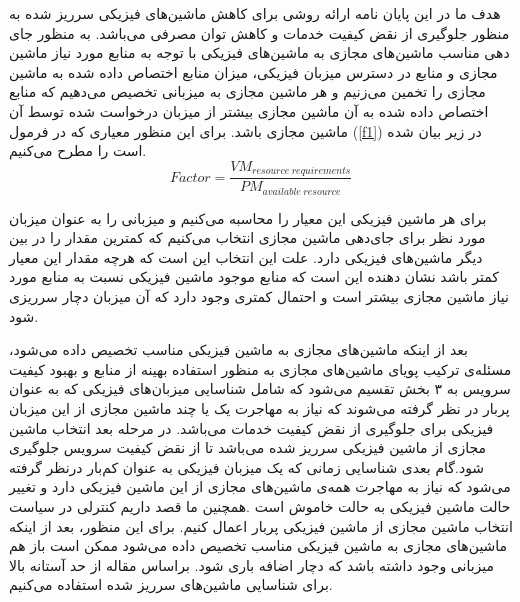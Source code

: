 هدف ما در این پایان نامه ارائه روشی برای کاهش ماشین‌های فیزیکی سرریز شده به منظور جلوگیری از نقض کیفیت خدمات و کاهش توان مصرفی می‌باشد. به منظور جای دهی مناسب ماشین‌های مجازی به ماشین‌های فیزیکی با توجه به منابع مورد نیاز ماشین مجازی و منابع در دسترس میزبان فیزیکی، میزان منابع اختصاص داده شده به ماشین مجازی را تخمین می‌زنیم و هر ماشین مجازی به میزبانی تخصیص می‌دهیم که منابع اختصاص داده شده به آن ماشین مجازی بیشتر از میزبان درخواست شده توسط آن ماشین مجازی باشد. برای این منظور معیاری که در فرمول
(\ref{f1})
 در زیر بیان شده است را مطرح می‌کنیم.
 \begin{equation}
Factor= \frac{VM_{resource\hspace{3pt} requirements}}{PM_{available\hspace{3pt} resource}}
\label{f1}
 \end{equation}
                                                                                


برای هر ماشین فیزیکی این معیار را محاسبه می‌کنیم و میزبانی را به عنوان میزبان مورد نظر برای جای‌دهی ماشین مجازی انتخاب می‌کنیم که کمترین مقدار را در بین دیگر ماشین‌های فیزیکی دارد. علت این انتخاب این است که هرچه مقدار این معیار کمتر باشد نشان دهنده این است که منابع موجود ماشین فیزیکی نسبت به منابع مورد نیاز ماشین مجازی بیشتر است و احتمال کمتری وجود دارد که آن میزبان دچار سرریزی شود. 


بعد از اینکه ماشین‌های مجازی به ماشین فیزیکی مناسب تخصیص داده می‌شود، مسئله‌ی ترکیب پویای ماشین‌های مجازی به منظور استفاده بهینه از منابع و بهبود کیفیت سرویس به ۳ بخش تقسیم می‌شود که شامل شناسایی میزبان‌های فیزیکی که به عنوان پربار در نظر گرفته می‌شوند که نیاز به مهاجرت یک یا چند ماشین مجازی از این میزبان فیزیکی برای جلوگیری از نقض کیفیت خدمات می‌باشد. در مرحله بعد انتخاب ماشین مجازی از ماشین فیزیکی سرریز شده می‌باشد تا از نقض کیفیت سرویس جلوگیری شود.گام بعدی شناسایی زمانی که یک میزبان فیزیکی به عنوان کم‌بار
 در‌نظر گرفته می‌شود که نیاز به مهاجرت همه‌ی ماشین‌های مجازی از این ماشین فیزیکی دارد و تغییر حالت ماشین فیزیکی به حالت خاموش است
\cite{num9,num15}
.همچنین ما قصد داریم کنترلی در سیاست انتخاب ماشین مجازی از ماشین فیزیکی پربار اعمال کنیم. برای این منظور، بعد از اینکه ماشین‌های مجازی به ماشین فیزیکی مناسب تخصیص داده می‌شود ممکن است باز هم میزبانی وجود داشته باشد که دچار اضافه باری شود. براساس مقاله 
\cite{num9,num15}
 از حد آستانه بالا
  برای شناسایی ماشین‌های سرریز شده استفاده می‌کنیم. 

